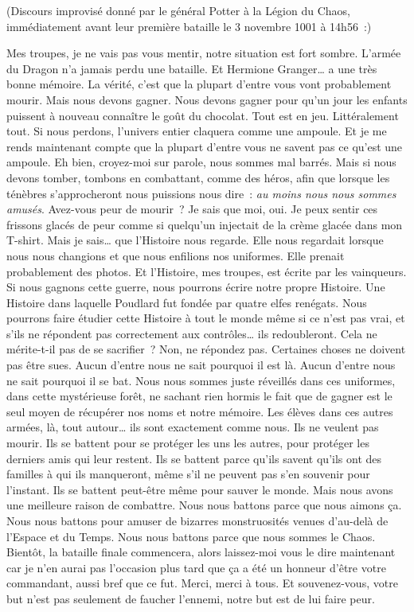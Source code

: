 \later

(Discours improvisé donné par le général Potter à la Légion du Chaos, immédiatement avant leur première bataille le 3 novembre 1001 à 14h56~:)

Mes troupes, je ne vais pas vous mentir, notre situation est fort sombre. L'armée du Dragon n'a jamais perdu une bataille. Et Hermione Granger… a une très bonne mémoire. La vérité, c'est que la plupart d'entre vous vont probablement mourir. Mais nous devons gagner. Nous devons gagner pour qu'un jour les enfants puissent à nouveau connaître le goût du chocolat. Tout est en jeu. Littéralement tout. Si nous perdons, l'univers entier claquera comme une ampoule. Et je me rends maintenant compte que la plupart d'entre vous ne savent pas ce qu'est une ampoule. Eh bien, croyez-moi sur parole, nous sommes mal barrés. Mais si nous devons tomber, tombons en combattant, comme des héros, afin que lorsque les ténèbres s'approcheront nous puissions nous dire~: \emph{au moins nous nous sommes amusés}. Avez-vous peur de mourir~? Je sais que moi, oui. Je peux sentir ces frissons glacés de peur comme si quelqu'un injectait de la crème glacée dans mon T-shirt. Mais je sais… que l'Histoire nous regarde. Elle nous regardait lorsque nous nous changions et que nous enfilions nos uniformes. Elle prenait probablement des photos. Et l'Histoire, mes troupes, est écrite par les vainqueurs. Si nous gagnons cette guerre, nous pourrons écrire notre propre Histoire. Une Histoire dans laquelle Poudlard fut fondée par quatre elfes renégats. Nous pourrons faire étudier cette Histoire à tout le monde même si ce n'est pas vrai, et s'ils ne répondent pas correctement aux contrôles… ils redoubleront. Cela ne mérite-t-il pas de se sacrifier~? Non, ne répondez pas. Certaines choses ne doivent pas être sues. Aucun d'entre nous ne sait pourquoi il est là. Aucun d'entre nous ne sait pourquoi il se bat. Nous nous sommes juste réveillés dans ces uniformes, dans cette mystérieuse forêt, ne sachant rien hormis le fait que de gagner est le seul moyen de récupérer nos noms et notre mémoire. Les élèves dans ces autres armées, là, tout autour… ils sont exactement comme nous. Ils ne veulent pas mourir. Ils se battent pour se protéger les uns les autres, pour protéger les derniers amis qui leur restent. Ils se battent parce qu'ils savent qu'ils ont des familles à qui ils manqueront, même s'il ne peuvent pas s'en souvenir pour l'instant. Ils se battent peut-être même pour sauver le monde. Mais nous avons une meilleure raison de combattre. Nous nous battons parce que nous aimons ça. Nous nous battons pour amuser de bizarres monstruosités venues d'au-delà de l'Espace et du Temps. Nous nous battons parce que nous sommes le Chaos. Bientôt, la bataille finale commencera, alors laissez-moi vous le dire maintenant car je n'en aurai pas l'occasion plus tard que ça a été un honneur d'être votre commandant, aussi bref que ce fut. Merci, merci à tous. Et souvenez-vous, votre but n'est pas seulement de faucher l'ennemi, notre but est de lui faire peur.


